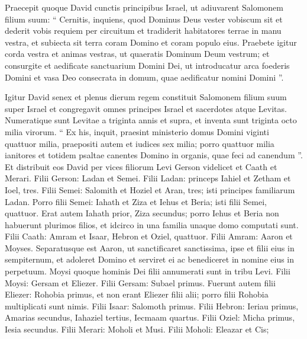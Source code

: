 \begin{biblechapter}
\begin{biblechapter}
\begin{biblechapter}
\begin{biblechapter}
\begin{biblechapter}
\begin{biblechapter}
\begin{biblechapter}
\begin{biblechapter}
\begin{biblechapter}
\begin{biblechapter}
\begin{biblechapter}
\begin{biblechapter}
\begin{biblechapter}
\begin{biblechapter}
\begin{biblechapter}
\begin{biblechapter}
\begin{biblechapter}
\begin{biblechapter}
\begin{biblechapter}
\begin{biblechapter}
\begin{biblechapter}
\begin{biblechapter}
 \verse Praecepit quoque David cunctis principibus Israel, ut adiuvarent Salomonem filium suum: “ 
\verse Cernitis, inquiens, quod Dominus Deus vester vobiscum sit et dederit vobis requiem per circuitum et tradiderit habitatores terrae in manu vestra, et subiecta sit terra coram Domino et coram populo eius. 
\verse Praebete igitur corda vestra et animas vestras, ut quaeratis Dominum Deum vestrum; et consurgite et aedificate sanctuarium Domini Dei, ut introducatur arca foederis Domini et vasa Deo consecrata in domum, quae aedificatur nomini Domini ”.
 
\begin{biblechapter}
\verse Igitur David senex et plenus dierum regem constituit Salomonem filium suum super Israel 
\verse et congregavit omnes principes Israel et sacerdotes atque Levitas.
 \verse Numeratique sunt Levitae a triginta annis et supra, et inventa sunt triginta octo milia virorum. 
\verse “ Ex his, inquit, praesint ministerio domus Domini viginti quattuor milia, praepositi autem et iudices sex milia; 
\verse porro quattuor milia ianitores et totidem psaltae canentes Domino in organis, quae feci ad canendum ”.
 \verse Et distribuit eos David per vices filiorum Levi Gerson videlicet et Caath et Merari.
 \verse Filii Gerson: Ladan et Semei. 
\verse Filii Ladan: princeps Iahiel et Zetham et Ioel, tres. 
\verse Filii Semei: Salomith et Hoziel et Aran, tres; isti principes familiarum Ladan. 
\verse Porro filii Semei: Iahath et Ziza et Iehus et Beria; isti filii Semei, quattuor. 
\verse Erat autem Iahath prior, Ziza secundus; porro Iehus et Beria non habuerunt plurimos filios, et idcirco in una familia unaque domo computati sunt.
 \verse Filii Caath: Amram et Isaar, Hebron et Oziel, quattuor. 
\verse Filii Amram: Aaron et Moyses. Separatusque est Aaron, ut sanctificaret sanctissima, ipse et filii eius in sempiternum, et adoleret Domino et serviret ei ac benediceret in nomine eius in perpetuum. 
\verse Moysi quoque hominis Dei filii annumerati sunt in tribu Levi. 
\verse Filii Moysi: Gersam et Eliezer. 
\verse Filii Gersam: Subael primus. 
\verse Fuerunt autem filii Eliezer: Rohobia primus, et non erant Eliezer filii alii; porro filii Rohobia multiplicati sunt nimis. 
\verse Filii Isaar: Salomoth primus. 
\verse Filii Hebron: Ieriau primus, Amarias secundus, Iahaziel tertius, Iecmaam quartus. 
\verse Filii Oziel: Micha primus, Iesia secundus.
 \verse Filii Merari: Moholi et Musi. Filii Moholi: Eleazar et Cis; 

\end{biblechapter}
\end{biblechapter}
\end{biblechapter}
\end{biblechapter}
\end{biblechapter}
\end{biblechapter}
\end{biblechapter}
\end{biblechapter}
\end{biblechapter}
\end{biblechapter}
\end{biblechapter}
\end{biblechapter}
\end{biblechapter}
\end{biblechapter}
\end{biblechapter}
\end{biblechapter}
\end{biblechapter}
\end{biblechapter}
\end{biblechapter}
\end{biblechapter}
\end{biblechapter}
\end{biblechapter}
\end{biblechapter}
